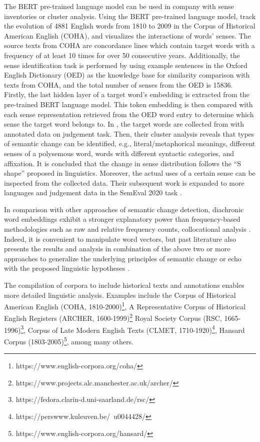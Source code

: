 The BERT pre-trained language model can be used in company with sense inventories or cluster analysis. Using the BERT pre-trained language model, \textcite{hu2019diachronic} track the evolution of 4881 English words from 1810 to 2009 in the Corpus of Historical American English (COHA), and visualizes the interactions of words' senses. The source texts from COHA are concordance lines which contain target words with a frequency of at least 10 times for over 50 consecutive years. Additionally, the sense identification task is performed by using example sentences in the Oxford English Dictionary (OED) as the knowledge base for similarity comparison with texts from COHA, and the total number of senses from the OED is 15836. Firstly, the last hidden layer of a target word's embedding is extracted from the pre-trained BERT language model. This token embedding is then compared with each sense representation retrieved from the OED word entry to determine which sense the target word belongs to. In \textcite{giulianelli2019lexical}, the target words are collected from \textcite{gulordava2011distributional} with annotated data on judgement task. Then, their cluster analysis reveals that types of semantic change can be identified, e.g., literal/metaphorical meanings, different senses of a polysemous word, words with different syntactic categories, and affixation. It is concluded that the change in sense distribution follows the ``S shape'' proposed in linguistics. Moreover, the actual uses of a certain sense can be inspected from the collected data. Their subsequent work is expanded to more languages and judgement data in the SemEval 2020 task \parencite{kutuzov2020uio}.

In comparison with other approaches of semantic change detection, diachronic word embeddings exhibit a stronger explanatory power than frequency-based methodologies such as raw and relative frequency counts, collocational analysis \parencite{kutuzov2018survey}. Indeed, it is convenient to manipulate word vectors, but past literature also presents the results and analysis in combination of the above two or more approaches to generalize the underlying principles of semantic change or echo with the proposed linguistic hypotheses \parencite{tahmasebi2018survey}.%

The compilation of corpora to include historical texts and annotations enables more detailed linguistic analysis. Examples include
the Corpus of Historical American English (COHA, 1810-2000)\footnote{https://www.english-corpora.org/coha/}, 
A Representative Corpus of Historical English Registers (ARCHER, 1600-1999)\footnote{https://www.projects.alc.manchester.ac.uk/archer/}
Royal Society Corpus (RSC, 1665-1996)\footnote{https://fedora.clarin-d.uni-saarland.de/rsc/}, 
Corpus of Late Modern English Texts (CLMET, 1710-1920)\footnote{https://perswww.kuleuven.be/~u0044428/}, 
Hansard Corpus (1803-2005)\footnote{https://www.english-corpora.org/hansard/}, among many others.

